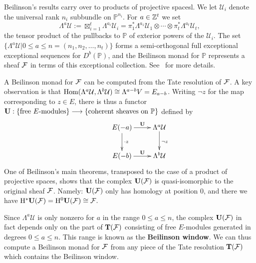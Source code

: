 \documentclass[twoside,12pt, leqno]{amsart}
\def\PP{{\mathbb P}}
\DeclareMathOperator{\rH}{{\rm H}}
\def\bT{{\bf T}}
\def\bU{{\bf U}}
\def\rH{{\rm H}}
\def\CU{{\mathcal U}}
\begin{document}


Beilinson's results carry over to products of projective spacesl.  We let $\CU_i$ denote the universal rank $n_i$ subbundle on $\PP^{n_i}$.  For $a\in {\mathbb Z}^{t}$ we set
$$
\Lambda^a \CU := \boxtimes_{i=1}^t \Lambda^{a_i} \CU_i=\pi_1^*\Lambda^{a_1}\CU_1 \otimes \cdots \otimes \pi_t^*\Lambda^{a_t} \CU_t,
$$
the tensor product of the pullbacks to $\PP$ of exterior powers of the $\CU_i$. The set $\{\Lambda^a \CU | 0 \leq a \leq n=(n_1,n_2,\dots,n_t)\}$ forms a semi-orthogonal full exceptional exceptional sequences for $D^b(\PP)$, and the Beilinson monad for $\PP$ represents a sheaf ${\mathcal F}$ in terms of this exceptional collection.  See~\cite[\S2]{EES} for more details.

A Beilinson monad for ${\mathcal F}$ can be computed from the Tate resolution of ${\mathcal F}$.  A key observation is that $\Hom(\Lambda^a \CU,\Lambda^b\CU) \cong \Lambda^{a-b} V=E_{a-b}$.  Writing $\neg z$ for the map corresponding to $z\in E$, there is thus a functor
$
\bU: \{ \hbox{free $E$-modules}\} \longrightarrow \{ \hbox{coherent sheaves on $\PP$} \}  \\
$ defined by
\[
\xymatrix{
&E(-a)\ar[r]^-{\bU}\ar[d]^-{\cdot z}&\Lambda^a \CU\ar[d]^{\neg z}\\
&E(-b)\ar[r]^-{\bU}&\Lambda^b \CU\\
}
\]
One of Beilinson's main theorems, transposed to the case of a product of projective spaces, shows that the complex $\bU(\sF)$ is quasi-isomorphic to the original sheaf ${\mathcal F}$.  Namely: $\bU(\sF)$ only has homology at position $0$, and there we have $ \rH^* \bU(\sF) = \rH^0 \bU(\sF) \cong \sF.$

Since  $\Lambda^a \CU$ is only nonzero for $a$ in the range $0 \le a \le n$, the complex $\bU(\sF)$ in fact depends only on the  part of $\bT(\sF)$ consisting of free $E$-modules generated in degrees $0\le a \le n$.  This range is known as the {\bf Beilinson window}.  We can thus  compute a Beilinson monad for ${\mathcal F}$ from any piece of the Tate resolution $\bT(\sF)$ which contains the Beilinson window.
\end{document}
